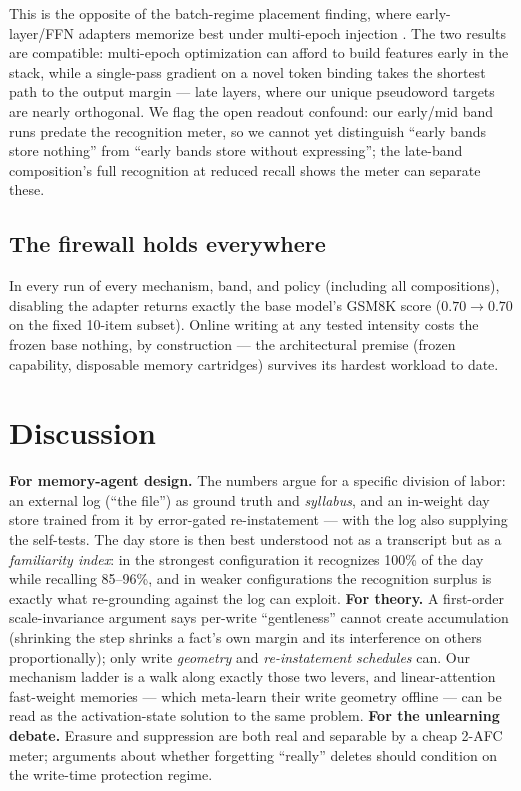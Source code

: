 \documentclass[11pt]{article}
\begin{document}
This is the opposite of the batch-regime placement finding, where early-layer/FFN adapters memorize
best under multi-epoch injection \citep{back2026lora}. The two results are compatible: multi-epoch
optimization can afford to build features early in the stack, while a single-pass gradient on a novel
token binding takes the shortest path to the output margin --- late layers, where our unique pseudoword
targets are nearly orthogonal. We flag the open readout confound: our early/mid band runs predate the
recognition meter, so we cannot yet distinguish ``early bands store nothing'' from ``early bands store
without expressing''; the late-band composition's full recognition at reduced recall shows the meter
can separate these.

\subsection{The firewall holds everywhere}

In every run of every mechanism, band, and policy (including all compositions), disabling the adapter
returns exactly the base model's GSM8K score ($0.70 \to 0.70$ on the fixed 10-item subset). Online
writing at any tested intensity costs the frozen base nothing, by construction --- the architectural
premise (frozen capability, disposable memory cartridges) survives its hardest workload to date.

\section{Discussion}\label{sec:discussion}

\textbf{For memory-agent design.} The numbers argue for a specific division of labor: an external log
(``the file'') as ground truth and \emph{syllabus}, and an in-weight day store trained from it by
error-gated re-instatement --- with the log also supplying the self-tests. The day store is then best
understood not as a transcript but as a \emph{familiarity index}: in the strongest configuration it
recognizes 100\% of the day while recalling 85--96\%, and in weaker configurations the recognition
surplus is exactly what re-grounding against the log can exploit. \textbf{For theory.} A first-order
scale-invariance argument says per-write ``gentleness'' cannot create accumulation (shrinking the step
shrinks a fact's own margin and its interference on others proportionally); only write \emph{geometry}
and \emph{re-instatement schedules} can. Our mechanism ladder is a walk along exactly those two levers,
and linear-attention fast-weight memories --- which meta-learn their write geometry offline
\citep{ahn2025} --- can be read as the activation-state solution to the same problem.
\textbf{For the unlearning debate.} Erasure and suppression are both real and separable by a cheap
2-AFC meter; arguments about whether forgetting ``really'' deletes should condition on the write-time
protection regime.
\end{document}
